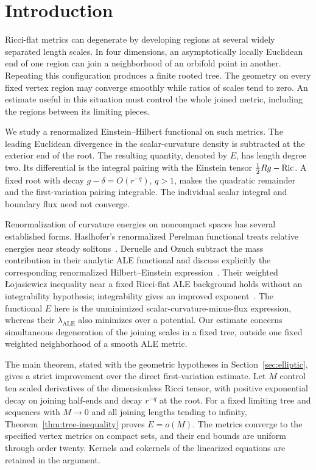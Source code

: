 \section{Introduction}\label{sec:introduction}

Ricci-flat metrics can degenerate by developing regions at several widely
separated length scales. In four dimensions, an asymptotically locally
Euclidean end of one region can join a neighborhood of an orbifold point
in another. Repeating this configuration produces a finite rooted tree.
The geometry on every fixed vertex region may converge smoothly while
ratios of scales tend to zero. An estimate useful in this situation must
control the whole joined metric, including the regions between its
limiting pieces.

We study a renormalized Einstein--Hilbert functional on such metrics.
The leading Euclidean divergence in the scalar-curvature density is
subtracted at the exterior end of the root. The resulting quantity,
denoted by $E$, has length degree two. Its differential is the integral
pairing with the Einstein tensor $\tfrac12 Rg-\operatorname{Ric}$.
A fixed root with decay $g-\delta=O(r^{-q})$, $q>1$, makes the
quadratic remainder and the first-variation pairing integrable. The
individual scalar integral and boundary flux need not converge.

Renormalization of curvature energies on noncompact spaces has several
established forms. Haslhofer's renormalized Perelman functional treats
relative energies near steady solitons~\cite{Haslhofer2011}.
Deruelle and Ozuch subtract the mass contribution in their analytic
ALE functional and discuss explicitly the corresponding renormalized
Hilbert--Einstein expression~\cite[Definition~4.2, Remark~4.3, and
Proposition~4.4]{DeruelleOzuch2025}. Their
weighted \L{}ojasiewicz inequality near a fixed Ricci-flat ALE background
holds without an integrability hypothesis; integrability gives an
improved exponent~\cite[Theorem~1.3]{DeruelleOzuch2025}. The functional
$E$ here is the unminimized scalar-curvature-minus-flux expression,
whereas their $\lambda_{\mathrm{ALE}}$ also minimizes over a potential.
Our estimate concerns simultaneous degeneration of the joining scales
in a fixed tree, outside one fixed weighted neighborhood of a smooth
ALE metric.

The main theorem, stated with the geometric hypotheses in
Section~\ref{sec:elliptic}, gives a strict improvement over the direct
first-variation estimate. Let $M$ control ten scaled derivatives of
the dimensionless Ricci tensor, with positive exponential decay on
joining half-ends and decay $r^{-q}$ at the root. For a fixed limiting
tree and sequences with $M\to0$ and all joining lengths tending to
infinity, Theorem~\ref{thm:tree-inequality} proves $E=o(M)$.
The metrics converge to the specified vertex metrics on compact sets,
and their end bounds are uniform through order twenty. Kernels and
cokernels of the linearized equations are retained in the argument.

